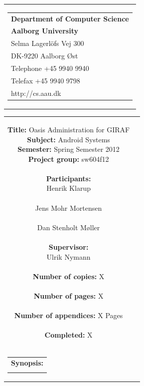 \begin{nopagebreak}
\samepage 
\begin{tabular}{r}
\parbox{\textwidth}{
\hfill \parbox{6.2cm}{\begin{tabular}{l}
{\textsf\small \textbf{Department of Computer Science }}\\
{\textsf\small  \textbf{Aalborg University}}\\
{\textsf\small Selma Lagerlöfs Vej 300}\\
{\textsf\small DK-9220 Aalborg Øst}\\
{\textsf\small Telephone +45 9940 9940}\\
{\textsf\small Telefax +45 9940 9798}\\
{\textsf\small http://cs.aau.dk}
\end{tabular}}}
\end{tabular}

\begin{tabular}{cc}
\parbox{7cm}{
\textbf{Title:} 
Oasis Administration for GIRAF\\
\textbf{Subject:} 
Android Systems\\
\textbf{Semester:} Spring Semester 2012\\
\textbf{Project group:} sw604f12\\ \\
\textbf{Participants:} \\
Henrik Klarup \\ \\
Jens Mohr Mortensen \\ \\
Dan Stenholt Møller \\ \\
\textbf{Supervisor:} \\
Ulrik Nymann\\ \\
\textbf{Number of copies:}
X \\ \\
\textbf{Number of pages:}
X \\ \\
\textbf{Number of appendices:}
X Pages\\ \\
\textbf{Completed:}
X \\ \\
}

\parbox{7cm}{
\vspace{.15cm}
\hfill 
\begin{tabular}{l}
\textbf{Synopsis:} \\
\fbox{
\parbox{6.5cm}{
{\vfill{\small {}\bigskip}}
}}
\end{tabular}}
\end{tabular}


\end{nopagebreak}